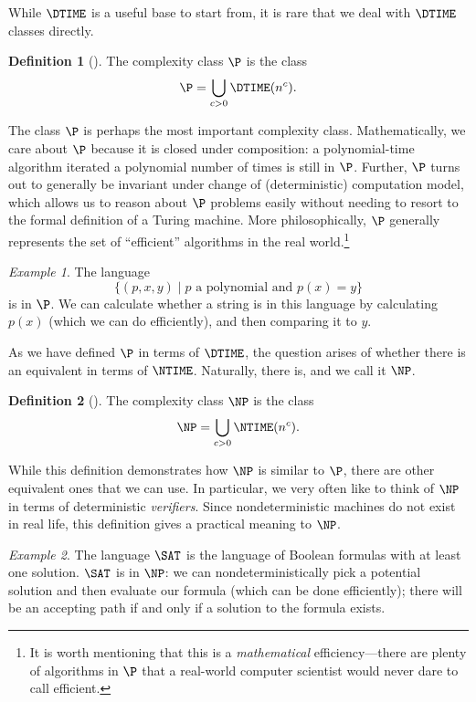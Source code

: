 \documentclass[english]{reedthesis}
\theoremstyle{plain}
\theoremstyle{definition}
\newtheorem{defn}[defn]{Definition}
\theoremstyle{remark}
\newtheorem{example}{Example}[thm]
\begin{document}
While $\DTIME$ is a useful base to start from, it is rare that we deal with
$\DTIME$ classes directly. %

\begin{defn}[{\cite[Def.\ 1.20]{AB09}}]\label{def:p}
  The complexity class $\P$ is the class
  \[
    \P = \bigcup_{c > 0}\DTIME(n^{c}).
  \]
\end{defn}

The class $\P$ is perhaps the most important complexity class. Mathematically,
we care about $\P$ because it is closed under composition: a polynomial-time
algorithm iterated a polynomial number of times is still in $\P$. Further, $\P$
turns out to generally be invariant under change of (deterministic) computation
model, which allows us to reason about $\P$ problems easily without needing to
resort to the formal definition of a Turing machine. More philosophically, $\P$
generally represents the set of ``efficient'' algorithms in the real
world.\footnote{It is worth mentioning that this is a \emph{mathematical}
  efficiency---there are plenty of algorithms in $\P$ that a real-world computer
  scientist would never dare to call efficient.}

\begin{example}\label{ex:polynomial-is-p}
  The language
  \[
    \{(p, x, y) \mid p \text{ a polynomial and } p(x) = y\}
  \]
  is in $\P$. We can calculate whether a string is in this language by
  calculating $p(x)$ (which we can do efficiently), and then comparing it to
  $y$.
\end{example}

As we have defined $\P$ in terms of $\DTIME$, the question arises of whether
there is an equivalent in terms of $\NTIME$. Naturally, there is, and we call it
$\NP$.

\begin{defn}[{\cite[Cor.\ 7.22]{Sip97}}]\label{def:np}
  The complexity class $\NP$ is the class
  \[
    \NP = \bigcup_{c > 0}\NTIME(n^{c}).
  \]
\end{defn}

While this definition demonstrates how $\NP$ is similar to $\P$, there are other
equivalent ones that we can use. In particular, we very often like to think of
$\NP$ in terms of deterministic \emph{verifiers}. Since nondeterministic
machines do not exist in real life, this definition gives a practical meaning to
$\NP$.

\begin{example}\label{ex:sat-is-np}
  The language $\SAT$ is the language of Boolean formulas with at least one
  solution. $\SAT$ is in $\NP$: we can nondeterministically pick a potential
  solution and then evaluate our formula (which can be done efficiently); there
  will be an accepting path if and only if a solution to the formula exists.
\end{example}
\end{document}

